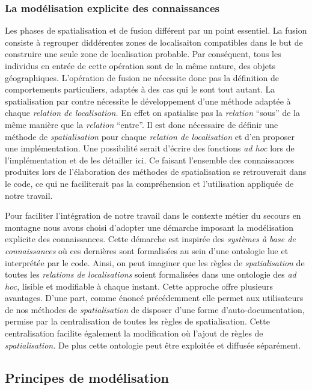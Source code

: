 \subsubsection{La modélisation explicite des connaissances}

Les phases de spatialisation et de fusion différent par un point
essentiel. La fusion consiste à regrouper diddérentes zones de
localisaiton compatibles dans le but de construire une seule zone de
localisation probable. Par conséquent, tous les individus en entrée de
cette opération sont de la même nature, \ie des objets
géographiques. L'opération de fusion ne nécessite donc pas la
définition de comportements particuliers, adaptés à des cas qui le
sont tout autant. La spatialisation par contre nécessite le
développement d'une méthode adaptée à chaque \emph{relation de
  localisation.} En effet on spatialise pas la \emph{relation}
\enquote{sous} de la même manière que la \emph{relation}
\enquote{entre}. Il est donc nécessaire de définir une méthode de
\emph{spatialisation} pour chaque \emph{relation de localisation} et
d'en proposer une implémentation. Une possibilité serait d'écrire des
fonctions \emph{ad hoc} lors de l'implémentation et de les détailler
ici. Ce faisant l'ensemble des connaissances produites lors de
l'élaboration des méthodes de spatialisation se retrouverait dans le
code, ce qui ne faciliterait pas la compréhension et l'utilisation
appliquée de notre travail.

Pour faciliter l'intégration de notre travail dans le contexte métier
du secours en montagne nous avons choisi d'adopter une démarche
imposant la modélisation explicite des connaissances. Cette démarche
est inspirée des \emph{systèmes à base de connaissances} où ces
dernières sont formalisées au sein d'une ontologie lue et interprétée
par le code. Ainsi, on peut imaginer que les règles de
\emph{spatialisation} de toutes les \emph{relations de localisations}
soient formalisées dans une ontologie des \emph{ad hoc,} lisible et
modifiable à chaque instant. Cette approche offre plusieurs
avantages. D'une part, comme énoncé précédemment elle permet aux
utilisateurs de nos méthodes de \emph{spatialisation} de disposer
d'une forme d'auto-documentation, permise par la centralisation de
toutes les règles de spatialisation. Cette centralisation facilite
également la modification où l'ajout de règles de
\emph{spatialisation.} De plus cette ontologie peut être exploitée et
diffusée séparément.

\subsection{Principes de modélisation}


